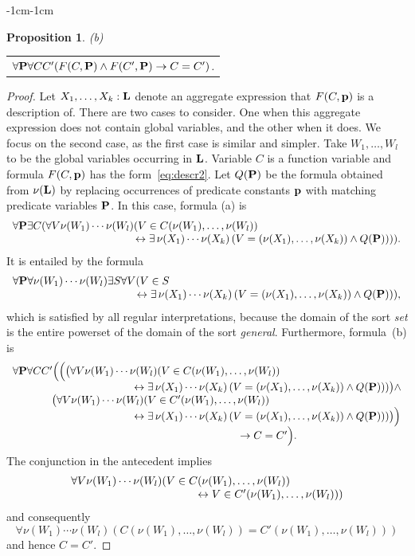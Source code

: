 \documentclass[11pt]{article}
\newtheorem{proposition}{Proposition}
\def\lrar{\leftrightarrow}
\def\ba{\begin{array}}
\def\ea{\end{array}}
\begin{document}
\begin{adjustwidth}{-1cm}{-1cm}
\begin{proposition}
 \medskip
 (b)
 \begin{tabular}{l} 
  $\forall {\bf P}\forall C C'(F(C,{\bf P}) \land F(C',{\bf P}) \to C=C')$.
\end{tabular}
\end{proposition}
\begin{proof}
Let  $X_1,\dots,X_k :{\bf L}$ denote an aggregate expression that $F(C,{\bf p})$ is a description of.
There are two cases to consider. One when this aggregate expression does not contain global variables, and the other when it does. We focus on the second case, as the first case is similar and simpler.
Take $W_1,\dots,W_l$ to be the global variables occurring in ${\bf L}$. Variable  $C$ is a function variable and formula $F(C,{\bf p})$ has the form~\eqref{eq:descr2}. Let $Q({\bf P})$ be the formula obtained from $\nu({\bf L})$ 
 by replacing occurrences of predicate constants $\bf p$ with matching predicate variables $\bf P$.
 In this case, formula (a) is
$$
\ba l
\forall {\bf P}
\exists C(
  \forall V \nu(W_1) \cdots \nu(W_l)(V\in C(\nu(W_1),\dots,\nu(W_l))\\
\hskip 4cm\lrar
\exists\, \nu(X_1)\cdots\nu(X_k)\,(V=(\nu(X_1),\dots,\nu(X_k))
\land 
Q({\bf P})))).
\ea
$$    
It is entailed by the formula
$$
\ba l
\forall {\bf P}
\forall \nu(W_1) \cdots \nu(W_l) \exists S \forall V (V\in S 
\\
\hskip 4cm\lrar
\exists\, \nu(X_1)\cdots\nu(X_k)\,(V=(\nu(X_1),\dots,\nu(X_k))
\land 
Q({\bf P}))),
\ea
$$
which is satisfied by all regular interpretations, because the domain of
the sort \emph{set} is the entire powerset of the domain of the sort
\emph{general}.  
Furthermore, formula~(b) is
$$\ba l
\forall {\bf P}
\forall C C'\Big( \Big( \big(
 \forall V \nu(W_1) \cdots \nu(W_l)(V\in C(\nu(W_1),\dots,\nu(W_l))\\
\hskip 4cm\lrar
\exists\, \nu(X_1)\cdots\nu(X_k)\,(V=(\nu(X_1),\dots,\nu(X_k))
\land 
Q({\bf P}))) \big)  \wedge\\
\ \ \ \ \ \ \ \  \ \ \  \big(\forall V \nu(W_1) \cdots \nu(W_l)(V\in C'(\nu(W_1),\dots,\nu(W_l))\\
\hskip 4cm\lrar
\exists\, \nu(X_1)\cdots\nu(X_k)\,(V=(\nu(X_1),\dots,\nu(X_k))
\land 
Q({\bf P})))\big)\Big)\\
\hskip 7.5cm
\to C=C'\Big).
\ea
$$
The conjunction in the antecedent implies
$$
\ba l

\forall V \nu(W_1) \cdots \nu(W_l) (V\in C(\nu(W_1),\dots,\nu(W_l))\\
\hskip 4cm\lrar
V\in C'(\nu(W_1),\dots,\nu(W_l)))
\ea
$$
and consequently
$$
\forall \nu(W_1) \cdots \nu(W_l) (C(\nu(W_1),\dots,\nu(W_l))= C'(\nu(W_1),\dots,\nu(W_l)))
$$
and hence $C=C'$.
\end{proof}




\end{adjustwidth}
\end{document}
